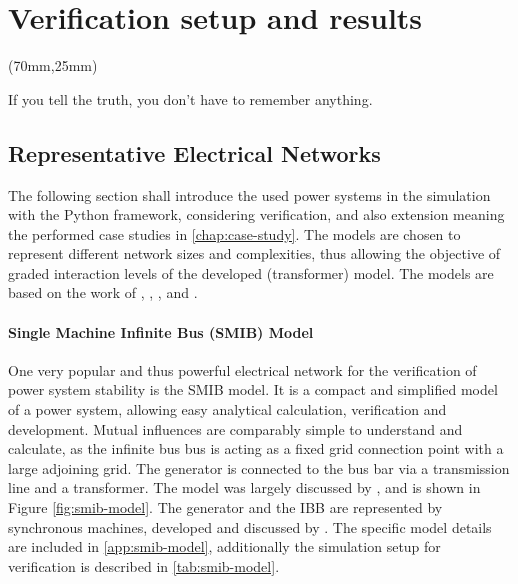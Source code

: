 


\chapter{Verification setup and results}

\begin{textblock*}{.7\textwidth}(70mm,25mm)
    \begin{fquote}
        If you tell the truth, you don't have to remember anything.
    \end{fquote}
\end{textblock*}

\section{Representative Electrical Networks}

The following section shall introduce the used power systems in the simulation with the Python framework, considering verification, and also extension meaning the performed case studies in \autoref{chap:case-study}. The models are chosen to represent different network sizes and complexities, thus allowing the objective of graded interaction levels of the developed (transformer) model. The models are based on the work of \textcite{machowskiPowerSystemDynamics2020}, \textcite{kundurPowerSystemStability2022}, \textcite{IEEEGuideLoad}, and \textcite{vancutsemTestSystemsVoltage2020}.

\subsubsection{Single Machine Infinite Bus (SMIB) Model}

One very popular and thus powerful electrical network for the verification of power system stability is the \acs{SMIB} model. It is a compact and simplified model of a power system, allowing easy analytical calculation, verification and development. Mutual influences are comparably simple to understand and calculate, as the infinite bus bus is acting as a fixed grid connection point with a large adjoining grid. The generator is connected to the bus bar via a transmission line and a transformer. The model was largely discussed by \textcite{kundurPowerSystemStability2022}, and is shown in Figure \ref{fig:smib-model}. The generator and the \acs{IBB} are represented by synchronous machines, developed and discussed by \textcite{kordowichPhysicsInformedMachine2023}. The specific model details are included in \autoref{app:smib-model}, additionally the simulation setup for verification is described in \autoref{tab:smib-model}.

